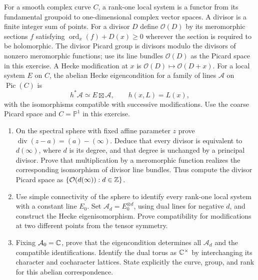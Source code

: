 \begin{exercise}
For a smooth complex curve $C$, a rank-one local system is a
functor from its fundamental groupoid to one-dimensional complex
vector spaces. A divisor is a finite integer sum of points.
For a divisor $D$ define $\mathcal O(D)$ by its meromorphic
sections $f$ satisfying $\operatorname{ord}_x(f)+D(x)\ge0$
wherever the section is required to be holomorphic.
The divisor Picard group is divisors modulo the divisors
of nonzero meromorphic functions; use its line bundles
$\mathcal O(D)$ as the Picard space in this exercise.
A Hecke modification at $x$ is
$\mathcal O(D)\mapsto\mathcal O(D+x)$.
For a local system $E$ on $C$, the abelian Hecke eigencondition
for a family of lines $\mathcal A$ on $\operatorname{Pic}(C)$ is
\[
 h^*\mathcal A\simeq E\boxtimes\mathcal A,\qquad
 h(x,L)=L(x),
\]
with the isomorphisms compatible with successive modifications.
Use the coarse Picard space and $C=\mathbb P^1$ in this exercise.
\begin{enumerate}[label=(\alph*)]
\item On the spectral sphere with fixed affine parameter $z$
prove $\operatorname{div}(z-a)=(a)-(\infty)$.
Deduce that every divisor is equivalent to $d(\infty)$,
where $d$ is its degree, and that degree is unchanged by
a principal divisor. Prove that multiplication by a
meromorphic function realizes the corresponding isomorphism
of divisor line bundles. Thus compute the divisor Picard
space as $\{\mathcal O(d(\infty)):d\in\mathbb Z\}$.
\item Use simple connectivity of the sphere to identify every
rank-one local system with a constant line $E_0$.
Set $\mathcal A_d=E_0^{\otimes d}$, using dual lines for
negative $d$, and construct the Hecke eigenisomorphism.
Prove compatibility for modifications at two different
points from the tensor symmetry.
\item Fixing $\mathcal A_0=\mathbb C$, prove that the eigencondition
determines all $\mathcal A_d$ and the compatible identifications.
Identify the dual torus as $\mathbb C^\times$ by interchanging its
character and cocharacter lattices. State explicitly the
curve, group, and rank for this abelian correspondence.
\end{enumerate}
\end{exercise}

